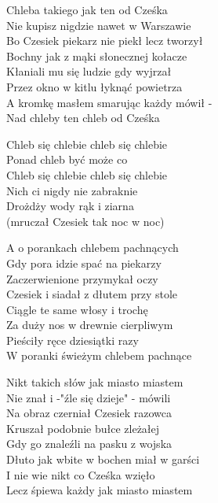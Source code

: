 
\begin{text}
    Chleba takiego jak ten od Cześka\\
    Nie kupisz nigdzie nawet w Warszawie\\
    Bo Czesiek piekarz nie piekł lecz tworzył\\
    Bochny jak z mąki słonecznej kołacze\\
    Kłaniali mu się ludzie gdy wyjrzał\\
    Przez okno w kitlu łyknąć powietrza\\
    A kromkę masłem smarując każdy mówił -\\
    Nad chleby ten chleb od Cześka

    \vin Chleb się chlebie chleb się chlebie\\
    \vin Ponad chleb być może co\\
    \vin Chleb się chlebie chleb się chlebie\\
    \vin Nich ci nigdy nie zabraknie\\
    \vin Drożdży wody rąk i ziarna\\
    \vin (mruczał Czesiek tak noc w noc)

    A o porankach chlebem pachnących\\
    Gdy pora idzie spać na piekarzy\\
    Zaczerwienione przymykał oczy\\
    Czesiek i siadał z dłutem przy stole\\
    Ciągle te same włosy i trochę\\
    Za duży nos w drewnie cierpliwym\\
    Pieściły ręce dziesiątki razy\\
    W poranki świeżym chlebem pachnące

    Nikt takich słów jak miasto miastem\\
    Nie znał i -"źle się dzieje" - mówili\\
    Na obraz czerniał Czesiek razowca\\
    Kruszał podobnie bułce zleżałej\\
    Gdy go znaleźli na pasku z wojska\\
    Dłuto jak wbite w bochen miał w garści\\
    I nie wie nikt co Cześka wzięło\\
    Lecz śpiewa każdy jak miasto miastem
\end{text}
